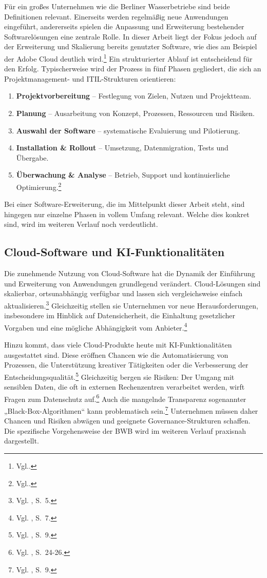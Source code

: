 \documentclass[
    12pt, 
    a4paper,
    ]{scrartcl} %
\begin{document}
Für ein großes Unternehmen wie die Berliner Wasserbetriebe sind beide Definitionen relevant. Einerseits werden regelmäßig neue Anwendungen eingeführt, andererseits spielen die Anpassung und Erweiterung bestehender Softwarelösungen eine zentrale Rolle. In dieser Arbeit liegt der Fokus jedoch auf der Erweiterung und Skalierung bereits genutzter Software, wie dies am Beispiel der Adobe Cloud deutlich wird.\footnote{Vgl.\cite{softwarevergleich2023}.}
Ein strukturierter Ablauf ist entscheidend für den Erfolg. Typischerweise wird der Prozess in fünf Phasen gegliedert, die sich an Projektmanagement- und ITIL-Strukturen orientieren:
\begin{enumerate}
    \item \textbf{Projektvorbereitung} – Festlegung von Zielen, Nutzen und Projektteam.
    \item \textbf{Planung} – Ausarbeitung von Konzept, Prozessen, Ressourcen und Risiken.
    \item \textbf{Auswahl der Software} – systematische Evaluierung und Pilotierung.
    \item \textbf{Installation \& Rollout} – Umsetzung, Datenmigration, Tests und Übergabe.
    \item \textbf{Überwachung \& Analyse} – Betrieb, Support und kontinuierliche Optimierung.\footnote{Vgl.\cite{papershift2022}.} 
\end{enumerate}
Bei einer Software-Erweiterung, die im Mittelpunkt dieser Arbeit steht, sind hingegen nur einzelne Phasen in vollem Umfang relevant. Welche dies konkret sind, wird im weiteren Verlauf noch verdeutlicht.  
 \subsection{Cloud-Software und KI-Funktionalitäten}

Die zunehmende Nutzung von Cloud-Software hat die Dynamik der Einführung und Erweiterung von Anwendungen grundlegend verändert. Cloud-Lösungen sind skalierbar, ortsunabhängig verfügbar und lassen sich vergleichsweise einfach aktualisieren.\footnote{Vgl. \cite{S_BSI_Grundlagen}, S.~5.} Gleichzeitig stellen sie Unternehmen vor neue Herausforderungen, insbesondere im Hinblick auf Datensicherheit, die Einhaltung gesetzlicher Vorgaben und eine mögliche Abhängigkeit vom Anbieter.\footnote{Vgl. \cite{S_BSI_Risiken}, S.~7.}

Hinzu kommt, dass viele Cloud-Produkte heute mit KI-Funktionalitäten ausgestattet sind. Diese eröffnen Chancen wie die Automatisierung von Prozessen, die Unterstützung kreativer Tätigkeiten oder die Verbesserung der Entscheidungsqualität.\footnote{Vgl. \cite{S_BSI_KI}, S.~9.} Gleichzeitig bergen sie Risiken: Der Umgang mit sensiblen Daten, die oft in externen Rechenzentren verarbeitet werden, wirft Fragen zum Datenschutz auf.\footnote{Vgl. \cite{S_ENISA_AI}, S.~24-26.} Auch die mangelnde Transparenz sogenannter „Black-Box-Algorithmen“ kann problematisch sein.\footnote{Vgl. \cite{S_ENISA_AI}, S.~9.} Unternehmen müssen daher Chancen und Risiken abwägen und geeignete Governance-Strukturen schaffen. Die spezifische Vorgehensweise der BWB wird im weiteren Verlauf praxisnah dargestellt.
\end{document}
